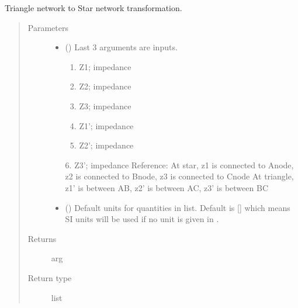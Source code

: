 \documentclass[letterpaper,10pt,english]{sphinxmanual}
\begin{document}

\begin{fulllineitems}
\label{\detokenize{components:components.Triangle2StarTransformation}}
Triangle network to Star network transformation.
\begin{quote}\begin{description}
\item[{Parameters}] \leavevmode\begin{itemize}
\item {} 
 () \textendash{} 
Last 3 arguments are inputs.
\begin{enumerate}
%
\item {} 
Z1; impedance

\item {} 
Z2; impedance

\item {} 
Z3; impedance

\item {} 
Z1’; impedance

\item {} 
Z2’; impedance

\end{enumerate}

6. Z3’; impedance
Reference:
At star, z1 is connected to A\sphinxhyphen{}node, z2 is connected to B\sphinxhyphen{}node, z3 is connected to C\sphinxhyphen{}node
At triangle, z1’ is between A\sphinxhyphen{}B, z2’ is between A\sphinxhyphen{}C, z3’ is between B\sphinxhyphen{}C


\item {} 
 (\sphinxstyleliteralemphasis{\sphinxupquote{, }}) \textendash{} Default units for quantities in  list. Default is {[}{]} which means SI units will be used if no unit is given in .

\end{itemize}

\item[{Returns}] \leavevmode
arg

\item[{Return type}] \leavevmode
list

\end{description}\end{quote}

\end{fulllineitems}
\end{document}
